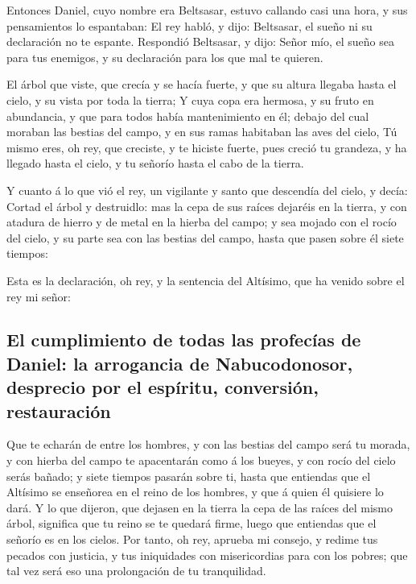  Entonces Daniel, cuyo nombre era Beltsasar, estuvo
callando casi una hora, y sus pensamientos lo espantaban: El rey habló,
y dijo: Beltsasar, el sueño ni su declaración no te espante. Respondió
Beltsasar, y dijo: Señor mío, el sueño sea para tus enemigos, y su
declaración para los que mal te quieren.

 El árbol que viste, que crecía y se hacía fuerte, y que
su altura llegaba hasta el cielo, y su vista por toda la tierra;
 Y cuya copa era hermosa, y su fruto en abundancia, y que
para todos había mantenimiento en él; debajo del cual moraban las
bestias del campo, y en sus ramas habitaban las aves del cielo,
 Tú mismo eres, oh rey, que creciste, y te hiciste
fuerte, pues creció tu grandeza, y ha llegado hasta el cielo, y tu
señorío hasta el cabo de la tierra.

 Y cuanto á lo que vió el rey, un vigilante y santo que
descendía del cielo, y decía: Cortad el árbol y destruidlo: mas la cepa
de sus raíces dejaréis en la tierra, y con atadura de hierro y de metal
en la hierba del campo; y sea mojado con el rocío del cielo, y su parte
sea con las bestias del campo, hasta que pasen sobre él siete tiempos:

 Esta es la declaración, oh rey, y la sentencia del
Altísimo, que ha venido sobre el rey mi señor:

\hypertarget{el-cumplimiento-de-todas-las-profecuxedas-de-daniel-la-arrogancia-de-nabucodonosor-desprecio-por-el-espuxedritu-conversiuxf3n-restauraciuxf3n}{%
\subsection{El cumplimiento de todas las profecías de Daniel: la
arrogancia de Nabucodonosor, desprecio por el espíritu, conversión,
restauración}\label{el-cumplimiento-de-todas-las-profecuxedas-de-daniel-la-arrogancia-de-nabucodonosor-desprecio-por-el-espuxedritu-conversiuxf3n-restauraciuxf3n}}

 Que te echarán de entre los hombres, y con las bestias
del campo será tu morada, y con hierba del campo te apacentarán como á
los bueyes, y con rocío del cielo serás bañado; y siete tiempos pasarán
sobre ti, hasta que entiendas que el Altísimo se enseñorea en el reino
de los hombres, y que á quien él quisiere lo dará.  Y lo
que dijeron, que dejasen en la tierra la cepa de las raíces del mismo
árbol, significa que tu reino se te quedará firme, luego que entiendas
que el señorío es en los cielos.  Por tanto, oh rey,
aprueba mi consejo, y redime tus pecados con justicia, y tus iniquidades
con misericordias para con los pobres; que tal vez será eso una
prolongación de tu tranquilidad.

